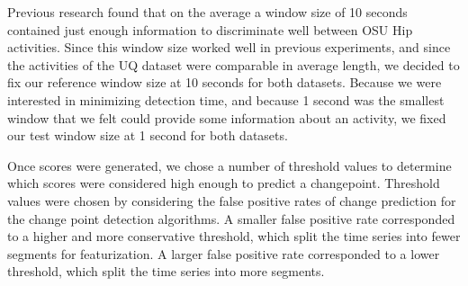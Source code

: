 Previous research \cite{zheng12} found that on the average a window size of 10
seconds contained just enough information to discriminate well between OSU Hip activities.
Since this window size worked well in previous experiments, and since the 
activities of the UQ dataset were comparable in average length, we decided to
fix our reference window size at 10 seconds for both datasets. Because we were interested in
minimizing detection time, and because 1 second was the smallest window that
we felt could provide some information about an activity, we fixed our test
window size at 1 second for both datasets.

Once scores were generated, we chose a number of threshold values to determine which
scores were considered high enough to predict a changepoint.
Threshold values were chosen by considering the false positive rates of
change prediction for the change point detection algorithms. A smaller false positive rate
corresponded to a higher and more conservative threshold, which split the
time series into fewer segments for featurization. A larger false positive rate
corresponded to a lower threshold, which split the time series into more segments.
